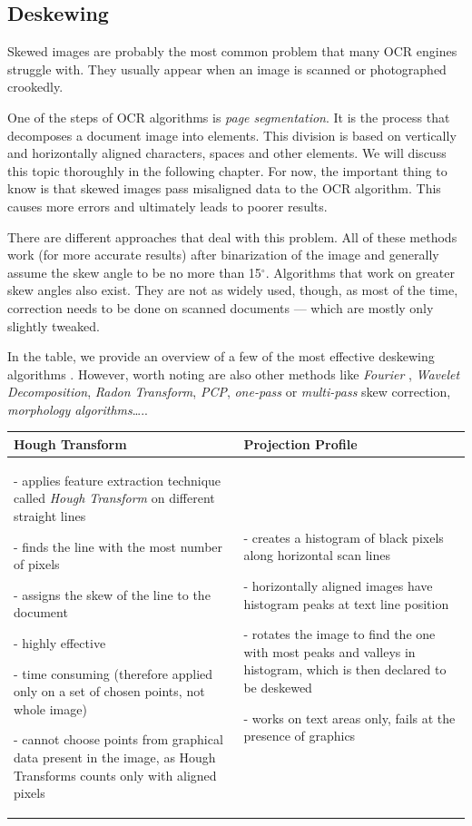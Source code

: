 \subsection{Deskewing}

Skewed images are probably the most common problem that many OCR engines struggle with. They usually appear when an image is scanned or photographed crookedly. 

One of the steps of OCR algorithms is \emph{page segmentation}. It is the process that decomposes a document image into elements. This division is based on vertically and horizontally aligned characters, spaces and other elements. We will discuss this topic thoroughly in the following chapter. For now, the important thing to know is that skewed images pass misaligned data to the OCR algorithm. This causes more errors and ultimately leads to poorer results.

There are different approaches that deal with this problem. All of these methods work (for more accurate results) after binarization of the image and generally assume the skew angle to be no more than 15$^{\circ}$. Algorithms that work on greater skew angles also exist\citep{skewAngleDetection}. They are not as widely used, though, as most of the time, correction needs to be done on scanned documents --- which are mostly only slightly tweaked.

In the  table, we provide an overview of a few of the most effective deskewing algorithms \citep{skewBestTechniques}. However, worth noting are also other methods like \emph{Fourier} \citep{fourierTransform}, \emph{Wavelet Decomposition}, \emph{Radon Transform}, \emph{PCP}, \emph{one-pass} or \emph{multi-pass} skew correction, \emph{morphology algorithms}\ldots.. 

\begin{longtable}{p{19em}p{19em}}
\textbf{Hough Transform} & \textbf{Projection Profile}\\
\midrule

- applies feature extraction technique called \emph{Hough Transform} \citep{houghTransform} on different straight lines

- finds the line with the most number of pixels

- assigns the skew of the line to the document

- highly effective

- time consuming (therefore applied only on a set of chosen points, not whole image)

- cannot choose points from graphical data present in the image, as Hough Transforms counts only with aligned pixels

&

- creates a histogram of black pixels along horizontal scan lines

- horizontally aligned images have histogram peaks at text line position

- rotates the image to find the one with most peaks and valleys in histogram, which is then declared to be deskewed

- works on text areas only, fails at the presence of graphics

\end{longtable}


